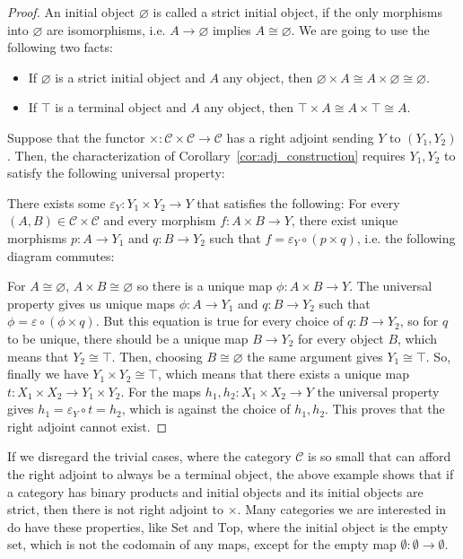 \begin{proof} An initial object $\varnothing$ is called a strict initial object, if the only morphisms into $\varnothing$ are isomorphisms, i.e. $A\to\varnothing$ implies $A\cong\varnothing$. We are going to use the following two facts:
\begin{itemize}
\item If $\varnothing$ is a strict initial object and $A$ any object, then $\varnothing\times A\cong A\times\varnothing\cong\varnothing$.
\item If $\top$ is a terminal object and $A$ any object, then $\top\times A\cong A\times\top\cong A$.
\end{itemize}
Suppose that the functor $\times:\mathcal{C}\times\mathcal{C}\to\mathcal{C}$ has a right adjoint sending $Y$ to $(Y_1,Y_2)$. Then, the characterization of Corollary~\ref{cor:adj_construction} requires $Y_1,Y_2$ to satisfy the following universal property:

There exists some $\varepsilon_Y:Y_1\times Y_2\to Y$ that satisfies the following: For every $(A,B)\in\mathcal{C}\times\mathcal{C}$ and every morphism $f:A\times B\to Y$, there exist unique morphisms $p:A\to Y_1$ and $q:B\to Y_2$ such that $f=\varepsilon_Y\circ(p\times q)$, i.e. the following diagram commutes:
\begin{center}
\end{center}
For $A\cong\varnothing$, $A\times B\cong\varnothing$ so there is a unique map $\phi:A\times B\to Y$. The universal property gives us unique maps $\phi:A\to Y_1$ and $q:B\to Y_2$ such that $\phi=\varepsilon\circ(\phi\times q)$. But this equation is true for every choice of $q:B\to Y_2$, so for $q$ to be unique, there should be a unique map $B\to Y_2$ for every object $B$, which means that $Y_2\cong\top$. Then, choosing $B\cong\varnothing$ the same argument gives $Y_1\cong\top$. So, finally we have $Y_1\times Y_2\cong\top$, which means that there exists a unique map $t:X_1\times X_2\to Y_1\times Y_2$. For the maps $h_1,h_2:X_1\times X_2\to Y$ the universal property gives $h_1=\varepsilon_Y\circ t=h_2$, which is against the choice of $h_1,h_2$. This proves that the right adjoint cannot exist.
\end{proof}
\begin{remark} If we disregard the trivial cases, where the category $\mathcal{C}$ is so small that can afford the right adjoint to always be a terminal object, the above example shows that if a category has binary products and initial objects and its initial objects are strict, then there is not right adjoint to $\times$. Many categories we are interested in do have these properties, like $\mathrm{Set}$ and $\mathrm{Top}$, where the initial object is the empty set, which is not the codomain of any maps, except for the empty map $\emptyset:\emptyset\to\emptyset$.
\end{remark}
